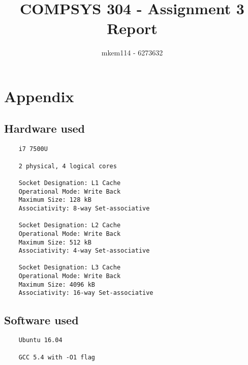 \documentclass[10pt,a4paper,oneside]{article}
\author{mkem114 - 6273632}
\title{COMPSYS 304 - Assignment 3 Report}
\begin{document}
    \maketitle

    \section*{Appendix}
        \subsection*{Hardware used}
            \begin{verbatim}
    i7 7500U

    2 physical, 4 logical cores

    Socket Designation: L1 Cache
    Operational Mode: Write Back
    Maximum Size: 128 kB
    Associativity: 8-way Set-associative

    Socket Designation: L2 Cache
    Operational Mode: Write Back
    Maximum Size: 512 kB
    Associativity: 4-way Set-associative

    Socket Designation: L3 Cache
    Operational Mode: Write Back
    Maximum Size: 4096 kB
    Associativity: 16-way Set-associative
            \end{verbatim}
        \subsection*{Software used}
            \begin{verbatim}
    Ubuntu 16.04

    GCC 5.4 with -O1 flag
            \end{verbatim}
\end{document}
